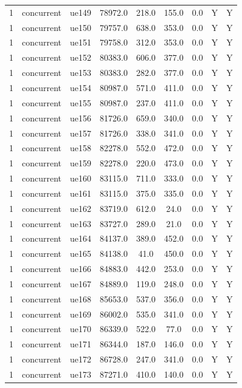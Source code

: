 \begin{table}[ht]
\begin{tabular}{|c|c|c|c|c|c|c|c|c|}
1 & concurrent & ue149 & 78972.0 & 218.0 & 155.0 & 0.0 & Y & Y \\
1 & concurrent & ue150 & 79757.0 & 638.0 & 353.0 & 0.0 & Y & Y \\
1 & concurrent & ue151 & 79758.0 & 312.0 & 353.0 & 0.0 & Y & Y \\
1 & concurrent & ue152 & 80383.0 & 606.0 & 377.0 & 0.0 & Y & Y \\
1 & concurrent & ue153 & 80383.0 & 282.0 & 377.0 & 0.0 & Y & Y \\
1 & concurrent & ue154 & 80987.0 & 571.0 & 411.0 & 0.0 & Y & Y \\
1 & concurrent & ue155 & 80987.0 & 237.0 & 411.0 & 0.0 & Y & Y \\
1 & concurrent & ue156 & 81726.0 & 659.0 & 340.0 & 0.0 & Y & Y \\
1 & concurrent & ue157 & 81726.0 & 338.0 & 341.0 & 0.0 & Y & Y \\
1 & concurrent & ue158 & 82278.0 & 552.0 & 472.0 & 0.0 & Y & Y \\
1 & concurrent & ue159 & 82278.0 & 220.0 & 473.0 & 0.0 & Y & Y \\
1 & concurrent & ue160 & 83115.0 & 711.0 & 333.0 & 0.0 & Y & Y \\
1 & concurrent & ue161 & 83115.0 & 375.0 & 335.0 & 0.0 & Y & Y \\
1 & concurrent & ue162 & 83719.0 & 612.0 & 24.0 & 0.0 & Y & Y \\
1 & concurrent & ue163 & 83727.0 & 289.0 & 21.0 & 0.0 & Y & Y \\
1 & concurrent & ue164 & 84137.0 & 389.0 & 452.0 & 0.0 & Y & Y \\
1 & concurrent & ue165 & 84138.0 & 41.0 & 450.0 & 0.0 & Y & Y \\
1 & concurrent & ue166 & 84883.0 & 442.0 & 253.0 & 0.0 & Y & Y \\
1 & concurrent & ue167 & 84889.0 & 119.0 & 248.0 & 0.0 & Y & Y \\
1 & concurrent & ue168 & 85653.0 & 537.0 & 356.0 & 0.0 & Y & Y \\
1 & concurrent & ue169 & 86002.0 & 535.0 & 341.0 & 0.0 & Y & Y \\
1 & concurrent & ue170 & 86339.0 & 522.0 & 77.0 & 0.0 & Y & Y \\
1 & concurrent & ue171 & 86344.0 & 187.0 & 146.0 & 0.0 & Y & Y \\
1 & concurrent & ue172 & 86728.0 & 247.0 & 341.0 & 0.0 & Y & Y \\
1 & concurrent & ue173 & 87271.0 & 410.0 & 140.0 & 0.0 & Y & Y \\

\end{tabular}
\end{table}
